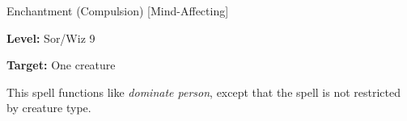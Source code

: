 
Enchantment (Compulsion) [Mind-Affecting]

\textbf{Level:} Sor/Wiz 9

\textbf{Target:} One creature

This spell functions like \textit{dominate person}, except that the spell is not 
restricted by creature type.

